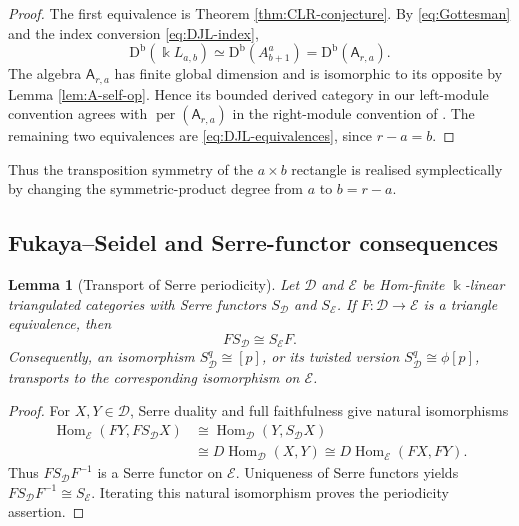 \documentclass[12pt,a4paper,english,reqno]{amsart}
\theoremstyle{plain}
\newtheorem{lemma}[theorem]{Lemma}
\theoremstyle{definition}
\newcommand{\kk}{\Bbbk}
\newcommand{\Db}{\mathrm D^{\mathrm b}}
\newcommand{\perf}{\operatorname{per}}
\newcommand{\Hom}{\operatorname{Hom}}
\begin{document}
\begin{proof}
The first equivalence is Theorem \ref{thm:CLR-conjecture}.  By
\eqref{eq:Gottesman} and the index conversion
\eqref{eq:DJL-index},
\[
 \Db(\kk L_{a,b})
 \simeq\Db(A_{b+1}^{a})
 =\Db(\mathsf A_{r,a}).
 \]
The algebra $\mathsf A_{r,a}$ has finite global dimension and is
isomorphic to its opposite by Lemma \ref{lem:A-self-op}.  Hence its bounded
derived category in our left-module convention agrees with
$\perf(\mathsf A_{r,a})$ in the right-module convention of
\cite{DJL}.  The remaining two equivalences are
\eqref{eq:DJL-equivalences}, since $r-a=b$.
\end{proof}

Thus the transposition symmetry of the $a\times b$ rectangle is realised
symplectically by changing the symmetric-product degree from $a$ to
$b=r-a$.

\subsection{Fukaya--Seidel and Serre-functor consequences}

\begin{lemma}[Transport of Serre periodicity]
\label{lem:transport-serre}
Let $\mathcal D$ and $\mathcal E$ be Hom-finite
$\kk$-linear triangulated categories with Serre functors
$S_{\mathcal D}$ and $S_{\mathcal E}$.  If
$F\colon\mathcal D\to\mathcal E$ is a triangle equivalence, then
\[
 F S_{\mathcal D}\cong S_{\mathcal E}F.
\]
Consequently, an isomorphism $S_{\mathcal D}^{q}\cong[p]$, or its
twisted version $S_{\mathcal D}^{q}\cong\phi[p]$, transports to the
corresponding isomorphism on $\mathcal E$.
\end{lemma}

\begin{proof}
For $X,Y\in\mathcal D$, Serre duality and full faithfulness give natural
isomorphisms
\[
\begin{split}
 \Hom_{\mathcal E}(FY,FS_{\mathcal D}X)
 &\cong\Hom_{\mathcal D}(Y,S_{\mathcal D}X)\\
 &\cong D\Hom_{\mathcal D}(X,Y)
 \cong D\Hom_{\mathcal E}(FX,FY).
\end{split}
\]
Thus $FS_{\mathcal D}F^{-1}$ is a Serre functor on $\mathcal E$.
Uniqueness of Serre functors yields
$FS_{\mathcal D}F^{-1}\cong S_{\mathcal E}$.  Iterating this natural
isomorphism proves the periodicity assertion.
\end{proof}
\end{document}
